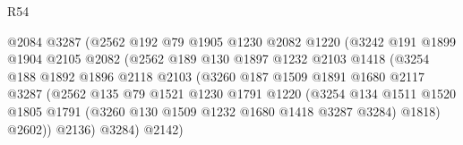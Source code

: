 \begin{lexlean}{R54}
\begin{coremodule}
                                  @2084
                                  @3287
                                  (@2562
                                    @192
                                    @79
                                    @1905
                                    @1230
                                    @2082
                                    @1220
                                    (@3242
                                      @191
                                      @1899
                                      @1904
                                      @2105
                                      @2082
                                      (@2562
                                        @189
                                        @130
                                        @1897
                                        @1232
                                        @2103
                                        @1418
                                        (@3254
                                          @188
                                          @1892
                                          @1896
                                          @2118
                                          @2103
                                          (@3260
                                            @187
                                            @1509
                                            @1891
                                            @1680
                                            @2117
                                            @3287
                                            (@2562
                                              @135
                                              @79
                                              @1521
                                              @1230
                                              @1791
                                              @1220
                                              (@3254
                                                @134
                                                @1511
                                                @1520
                                                @1805
                                                @1791
                                                (@3260 @130 @1509 @1232 @1680 @1418 @3287 @3284)
                                                @1818)
                                              @2602))
                                          @2136)
                                        @3284)
                                      @2142)

\end{coremodule}
\end{lexlean}
